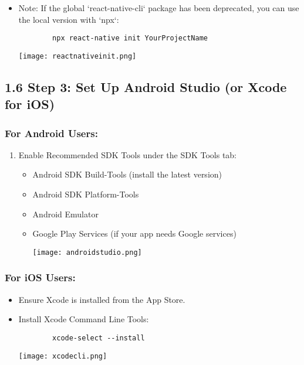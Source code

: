 \documentclass{article}
\begin{document}
\begin{enumerate}
\begin{itemize}
    \item Note: If the global `react-native-cli` package has been deprecated, you can use the local version with `npx`:
        \begin{verbatim}
        npx react-native init YourProjectName
        \end{verbatim}
        \centering
                \texttt{[image: reactnativeinit.png]}\\
\end{itemize}

\subsection*{1.6 Step 3: Set Up Android Studio (or Xcode for iOS)}

\subsubsection*{For Android Users:}

\begin{enumerate}

    \item Enable Recommended SDK Tools under the SDK Tools tab:
        \begin{itemize}
            \item Android SDK Build-Tools (install the latest version)
            \item Android SDK Platform-Tools
            \item Android Emulator
            \item Google Play Services (if your app needs Google services)
            
               \centering
                \texttt{[image: androidstudio.png]}\\
        \end{itemize}
\end{enumerate}

\subsubsection*{For iOS Users:}

\begin{itemize}
    \item Ensure Xcode is installed from the App Store.
    \item Install Xcode Command Line Tools:
        \begin{verbatim}
        xcode-select --install
        \end{verbatim}

         \centering
                \texttt{[image: xcodecli.png]}\\
        \end{itemize}
        \end{enumerate}
\end{document}

